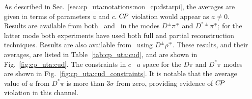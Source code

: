As described in Sec.~\ref{sec:cp_uta:notations:non_cp:dstarpi},
the averages are given in terms of parameters $a$ and $c$.
$C\!P$ violation would appear as $a \neq 0$.
Results are available from both \babar\ and \belle\ in the modes
$D^\pm\pi^\mp$ and $D^{*\pm}\pi^\mp$; for the latter mode both experiments 
have used both full and partial reconstruction techniques.
Results are also available from \babar\ using $D^\pm\rho^\mp$.
These results, and their averages, are listed in Table~\ref{tab:cp_uta:cud},
and are shown in Fig.~\ref{fig:cp_uta:cud}.
The constraints in $c$ \vs\ $a$ space for the $D\pi$ and $D^*\pi$ modes
are shown in Fig.~\ref{fig:cp_uta:cud_constraints}.
It is notable that the average value of $a$ from $D^*\pi$ is more than
$3\sigma$ from zero, providing evidence of $C\!P$ violation in this channel.



